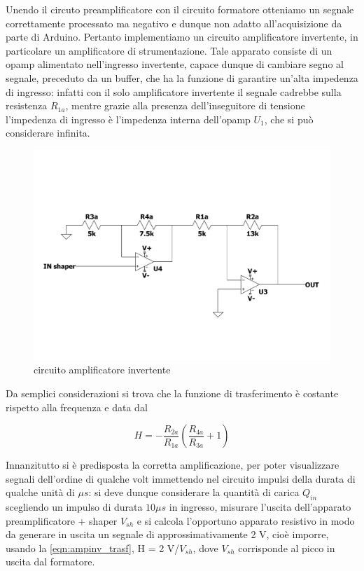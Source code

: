\documentclass{article}
\begin{document}
Unendo il circuto preamplificatore con il circuito formatore otteniamo un segnale correttamente processato ma negativo e dunque non
adatto all'acquisizione da parte di Arduino. Pertanto implementiamo un circuito amplificatore invertente, in particolare un
amplificatore di strumentazione. Tale apparato consiste di un opamp alimentato nell'ingresso invertente, capace dunque di cambiare
segno al segnale, preceduto da un buffer, che ha la funzione di garantire un'alta impedenza di ingresso: infatti con il solo 
amplificatore invertente il segnale cadrebbe sulla resistenza $R_{1a}$, mentre grazie alla presenza dell'inseguitore di tensione 
l'impedenza di ingresso è l'impedenza interna dell'opamp $U_1$, che si può considerare infinita.

\begin{center}
    \begin{figure}[H]
    \centering
    \includegraphics[scale=0.26, angle=0]{catena.pdf}
    \caption{circuito amplificatore invertente}
    \label{fig:shaper}
    \end{figure}
\end{center}

Da semplici considerazioni si trova che la funzione di trasferimento è costante rispetto alla frequenza e data dal

\begin{equation}
    \label{eqn:ampinv_trasf}
    H = - \frac{R_{2a}}{R_{1a}} \left( \frac{R_{4a}}{R_{3a}} + 1 \right)
\end{equation}

Innanzitutto si è predisposta la corretta amplificazione, per poter visualizzare segnali dell'ordine di qualche volt immettendo
nel circuito impulsi della durata di qualche unità di $\mu s$: si deve dunque considerare la quantità di carica $Q_{in}$ 
scegliendo un impulso di durata $10 \mu s$ in ingresso, misurare l'uscita dell'apparato preamplificatore + shaper $V_{sh}$ 
e si calcola l'opportuno apparato resistivo in modo da generare in uscita un segnale di approssimativamente 2 V, cioè imporre, usando
la \ref{eqn:ampinv_trasf}, H = 2 V/$V_{sh}$, dove $V_{sh}$ corrisponde al picco in uscita dal formatore.
\end{document}
